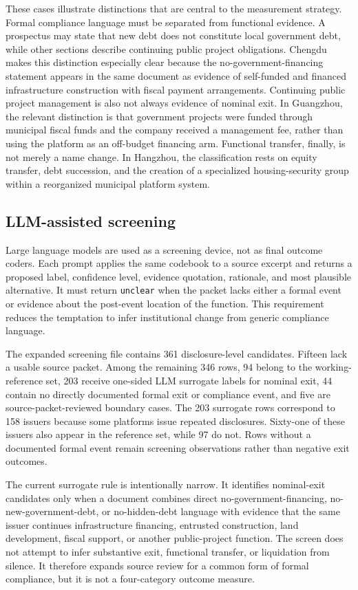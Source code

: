 These cases illustrate distinctions that are central to the measurement
strategy. Formal compliance language must be separated from functional
evidence. A prospectus may state that new debt does not constitute local
government debt, while other sections describe continuing public project
obligations. Chengdu makes this distinction especially clear because the
no-government-financing statement appears in the same document as evidence of
self-funded and financed infrastructure construction with fiscal payment
arrangements. Continuing public project management is also not always evidence
of nominal exit. In Guangzhou, the relevant distinction is that government
projects were funded through municipal fiscal funds and the company received a
management fee, rather than using the platform as an off-budget financing arm.
Functional transfer, finally, is not merely a name change. In Hangzhou, the
classification rests on equity transfer, debt succession, and the creation of a
specialized housing-security group within a reorganized municipal platform
system.

\subsection{LLM-assisted screening}

Large language models are used as a screening device, not as final outcome
coders. Each prompt applies the same codebook to a source excerpt and returns a
proposed label, confidence level, evidence quotation, rationale, and most
plausible alternative. It must return \texttt{unclear} when the packet lacks
either a formal event or evidence about the post-event location of the
function. This requirement reduces the temptation to infer institutional
change from generic compliance language.

The expanded screening file contains 361 disclosure-level candidates. Fifteen
lack a usable source packet. Among the remaining 346 rows, 94 belong to the
working-reference set, 203 receive one-sided LLM surrogate labels for
nominal exit, 44 contain no directly documented formal exit or compliance
event, and five are source-packet-reviewed boundary cases. The 203 surrogate rows
correspond to 158 issuers because some platforms issue repeated disclosures.
Sixty-one of these issuers also appear in the reference set, while 97 do not.
Rows without a documented formal event remain screening observations rather
than negative exit outcomes.

The current surrogate rule is intentionally narrow. It identifies nominal-exit
candidates only when a document combines direct no-government-financing,
no-new-government-debt, or no-hidden-debt language with evidence that the same
issuer continues infrastructure financing, entrusted construction, land
development, fiscal support, or another public-project function. The screen
does not attempt to infer substantive exit, functional transfer, or liquidation
from silence. It therefore expands source review for a common form of formal
compliance, but it is not a four-category outcome measure.


